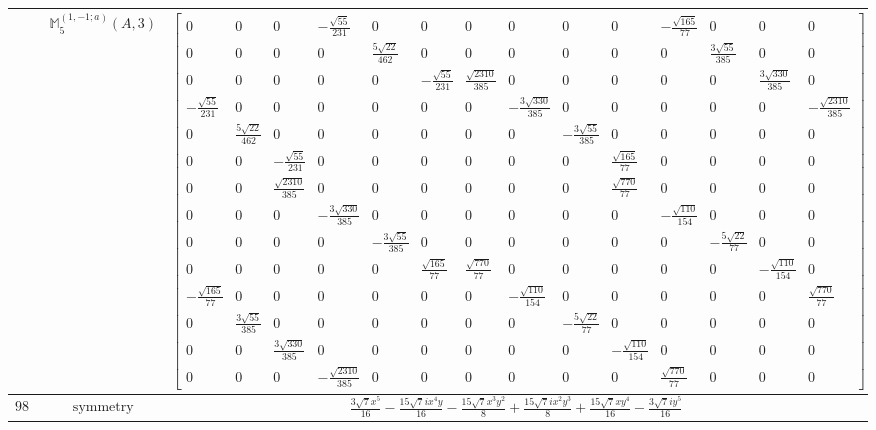 \documentclass[fleqn,8pt,landscape]{jsarticle}
\begin{document}
\begin{longtable}{ccc}
$  $ & $ \mathbb{M}_{5}^{(1,-1;a)}(A,3) $ & $ \begin{bmatrix} 0 & 0 & 0 & - \frac{\sqrt{55}}{231} & 0 & 0 & 0 & 0 & 0 & 0 & - \frac{\sqrt{165}}{77} & 0 & 0 & 0 \\ 0 & 0 & 0 & 0 & \frac{5 \sqrt{22}}{462} & 0 & 0 & 0 & 0 & 0 & 0 & \frac{3 \sqrt{55}}{385} & 0 & 0 \\ 0 & 0 & 0 & 0 & 0 & - \frac{\sqrt{55}}{231} & \frac{\sqrt{2310}}{385} & 0 & 0 & 0 & 0 & 0 & \frac{3 \sqrt{330}}{385} & 0 \\ - \frac{\sqrt{55}}{231} & 0 & 0 & 0 & 0 & 0 & 0 & - \frac{3 \sqrt{330}}{385} & 0 & 0 & 0 & 0 & 0 & - \frac{\sqrt{2310}}{385} \\ 0 & \frac{5 \sqrt{22}}{462} & 0 & 0 & 0 & 0 & 0 & 0 & - \frac{3 \sqrt{55}}{385} & 0 & 0 & 0 & 0 & 0 \\ 0 & 0 & - \frac{\sqrt{55}}{231} & 0 & 0 & 0 & 0 & 0 & 0 & \frac{\sqrt{165}}{77} & 0 & 0 & 0 & 0 \\ 0 & 0 & \frac{\sqrt{2310}}{385} & 0 & 0 & 0 & 0 & 0 & 0 & \frac{\sqrt{770}}{77} & 0 & 0 & 0 & 0 \\ 0 & 0 & 0 & - \frac{3 \sqrt{330}}{385} & 0 & 0 & 0 & 0 & 0 & 0 & - \frac{\sqrt{110}}{154} & 0 & 0 & 0 \\ 0 & 0 & 0 & 0 & - \frac{3 \sqrt{55}}{385} & 0 & 0 & 0 & 0 & 0 & 0 & - \frac{5 \sqrt{22}}{77} & 0 & 0 \\ 0 & 0 & 0 & 0 & 0 & \frac{\sqrt{165}}{77} & \frac{\sqrt{770}}{77} & 0 & 0 & 0 & 0 & 0 & - \frac{\sqrt{110}}{154} & 0 \\ - \frac{\sqrt{165}}{77} & 0 & 0 & 0 & 0 & 0 & 0 & - \frac{\sqrt{110}}{154} & 0 & 0 & 0 & 0 & 0 & \frac{\sqrt{770}}{77} \\ 0 & \frac{3 \sqrt{55}}{385} & 0 & 0 & 0 & 0 & 0 & 0 & - \frac{5 \sqrt{22}}{77} & 0 & 0 & 0 & 0 & 0 \\ 0 & 0 & \frac{3 \sqrt{330}}{385} & 0 & 0 & 0 & 0 & 0 & 0 & - \frac{\sqrt{110}}{154} & 0 & 0 & 0 & 0 \\ 0 & 0 & 0 & - \frac{\sqrt{2310}}{385} & 0 & 0 & 0 & 0 & 0 & 0 & \frac{\sqrt{770}}{77} & 0 & 0 & 0 \end{bmatrix} $ \\ \hline
$ 981 $ & $ \text{symmetry} $ & $ \frac{3 \sqrt{7} x^{5}}{16} - \frac{15 \sqrt{7} i x^{4} y}{16} - \frac{15 \sqrt{7} x^{3} y^{2}}{8} + \frac{15 \sqrt{7} i x^{2} y^{3}}{8} + \frac{15 \sqrt{7} x y^{4}}{16} - \frac{3 \sqrt{7} i y^{5}}{16} $ \\

\end{longtable}
\end{document}
